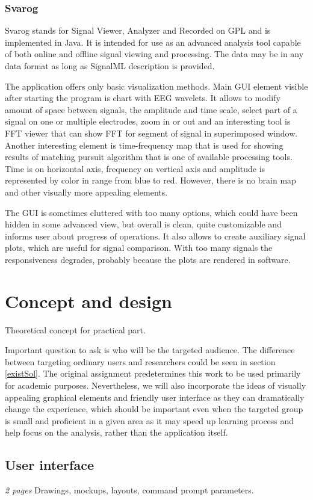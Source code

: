 \subsection{Svarog}
Svarog stands for Signal Viewer, Analyzer and Recorded on GPL and is
implemented in Java. It is intended for use as an advanced analysis tool capable
of both online and offline signal viewing and processing. The data may be in any
data format as long as SignalML description is provided.

The application offers only basic visualization methods. Main GUI element
visible after starting the program is chart with EEG wavelets. It allows to
modify amount of space between signals, the amplitude and time scale, select
part of a signal on one or multiple electrodes, zoom in or out and an
interesting tool is FFT viewer that can show FFT for segment of signal in
superimposed window. Another interesting element is time-frequency map that is
used for showing results of matching pursuit algorithm that is one of available
processing tools. Time is on horizontal axis, frequency on vertical axis and
amplitude is represented by color in range from blue to red. However, there is
no brain map and other visually more appealing elements.

The GUI is sometimes cluttered with too many options, which could have been
hidden in some advanced view, but overall is clean, quite customizable and
informs user about progress of operations. It also allows to create auxiliary
signal plots, which are useful for signal comparison. With too many signals
the responsiveness degrades, probably because the plots are rendered in software.
\chapter{Concept and design}
\label{concept}
Theoretical concept for practical part.

Important question to ask is who will be the targeted audience. The difference
between targeting ordinary users and researchers could be seen in section
\ref{existSol}. The original assignment predetermines this work to be used
primarily for academic purposes. Nevertheless, we will also incorporate the
ideas of visually appealing graphical elements and friendly user interface as
they can dramatically change the experience, which should be important even when
the targeted group is small and proficient in a given area as it may speed up
learning process and help focus on the analysis, rather than the application
itself.
\section{User interface}
\emph{2 pages}
Drawings, mockups, layouts, command prompt parameters.

